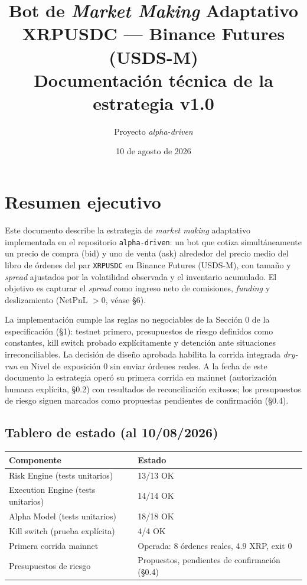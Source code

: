 \documentclass[11pt,a4paper]{article}
\title{\bfseries Bot de \emph{Market Making} Adaptativo\\[0.5em]
{\large XRPUSDC — Binance Futures (USDS-M)}\\[1.2em]
{\normalsize Documentación técnica de la estrategia v1.0}}
\author{Proyecto \emph{alpha-driven}}
\date{10 de agosto de 2026}
\newcommand{\codigo}[1]{\texttt{#1}}
\begin{document}
\maketitle

\section*{Resumen ejecutivo}

Este documento describe la estrategia de \emph{market making} adaptativo
implementada en el repositorio \codigo{alpha-driven}: un bot que cotiza
simultáneamente un precio de compra (bid) y uno de venta (ask) alrededor
del precio medio del libro de órdenes del par \codigo{XRPUSDC} en
Binance Futures (USDS-M), con tamaño y \emph{spread} ajustados por la
volatilidad observada y el inventario acumulado. El objetivo es capturar
el \emph{spread} como ingreso neto de comisiones, \emph{funding} y
deslizamiento (NetPnL $> 0$, véase §6).

La implementación cumple las reglas no negociables de la Sección 0 de la
especificación (§1): testnet primero, presupuestos de riesgo definidos
como constantes, kill switch probado explícitamente y detención ante
situaciones irreconciliables. La decisión de diseño aprobada habilita la
corrida integrada \emph{dry-run} en Nivel de exposición 0 sin enviar
órdenes reales. A la fecha de este documento la estrategia operó su
primera corrida en mainnet (autorización humana explícita, §0.2) con
resultados de reconciliación exitosos; los presupuestos de riesgo siguen
marcados como propuestas pendientes de confirmación (§0.4).

\subsection*{Tablero de estado (al 10/08/2026)}
\begin{center}
\begin{tabular}{ll}
\toprule
\textbf{Componente} & \textbf{Estado} \\
\midrule
Risk Engine (tests unitarios) & 13/13 OK \\
Execution Engine (tests unitarios) & 14/14 OK \\
Alpha Model (tests unitarios) & 18/18 OK \\
Kill switch (prueba explícita) & 4/4 OK \\
Primera corrida mainnet & Operada: 8 órdenes reales, 4.9 XRP, exit 0 \\
Presupuestos de riesgo & Propuestos, pendientes de confirmación (§0.4) \\
\bottomrule
\end{tabular}
\end{center}
\end{document}
